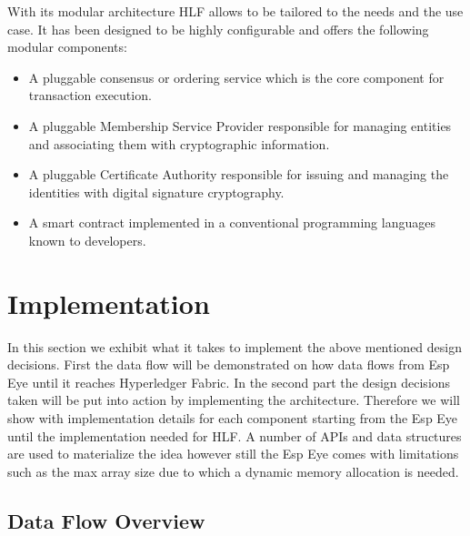 With its modular architecture HLF allows to be tailored to the needs and the use case. It has been designed to be highly configurable and offers the following modular components: 

\begin{itemize}
    \item A pluggable consensus or ordering service which is the core component for transaction execution.
    \item A pluggable Membership Service Provider responsible for managing entities and associating them with cryptographic information.
    \item A pluggable Certificate Authority responsible for issuing and managing the identities with digital signature cryptography.
     \item A smart contract implemented in a conventional programming languages known to developers. 
    
\end{itemize}



\section{Implementation}

In this section we exhibit what it takes to implement the above mentioned design decisions. First the data flow will be demonstrated on how data flows from Esp Eye until it reaches Hyperledger Fabric. 
In the second part the design decisions taken will be put into action by implementing the architecture. Therefore we will show with implementation details for each component starting from the Esp Eye until the implementation needed for HLF. A number of APIs and data structures are used to materialize the idea however still the Esp Eye comes with limitations such as the max array size due to which a dynamic memory allocation is needed.  





\subsection{Data Flow Overview}


